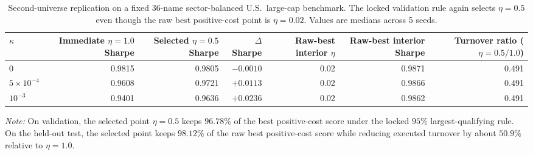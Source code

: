 \documentclass[10pt,twocolumn]{article}
\begin{document}
\begin{table}[H]
\centering
\scriptsize
\caption{Second-universe replication on a fixed 36-name sector-balanced U.S.\ large-cap benchmark. The locked validation rule again selects $\eta=0.5$ even though the raw best positive-cost point is $\eta=0.02$. Values are medians across 5 seeds.}
\label{tab:u36_replication}
\begin{tabular}{@{}lrrrrrr@{}}
\toprule
$\kappa$ & Immediate $\eta=1.0$ Sharpe & Selected $\eta=0.5$ Sharpe & $\Delta$Sharpe & Raw-best interior $\eta$ & Raw-best interior Sharpe & Turnover ratio ($\eta=0.5/1.0$) \\
\midrule
$0$ & 0.9815 & 0.9805 & $-0.0010$ & 0.02 & 0.9871 & 0.491 \\
$5\times10^{-4}$ & 0.9608 & 0.9721 & $+0.0113$ & 0.02 & 0.9866 & 0.491 \\
$10^{-3}$ & 0.9401 & 0.9636 & $+0.0236$ & 0.02 & 0.9862 & 0.491 \\
\bottomrule
\end{tabular}
\par\vspace{2pt}\raggedright\footnotesize{\textit{Note:} On validation, the selected point $\eta=0.5$ keeps $96.78\%$ of the best positive-cost score under the locked $95\%$ largest-qualifying rule. On the held-out test, the selected point keeps $98.12\%$ of the raw best positive-cost score while reducing executed turnover by about $50.9\%$ relative to $\eta=1.0$.}
\end{table}
\end{document}
